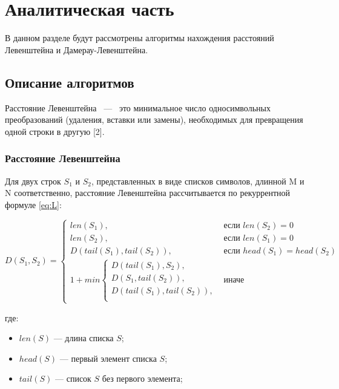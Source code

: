 \chapter{Аналитическая часть}

В данном разделе будут рассмотрены алгоритмы нахождения расстояний Левенштейна и Дамерау-Левенштейна.

\section{Описание алгоритмов}

Расстояние Левенштейна ~---~ это минимальное число односимвольных преобразований (удаления, вставки или замены), необходимых для превращения одной строки в другую [2].

\subsection{Расстояние Левенштейна}
Для двух строк $S_{1}$ и $S_{2}$, представленных в виде списков символов, длинной M и N соответственно, расстояние Левенштейна рассчитывается по рекуррентной формуле \ref{eq:L}:

\begin{equation}
	\label{eq:L}
	D(S_{1}, S_{2}) = \begin{cases}
	len(S_{1}), &\text{если $len(S_{2})=0$}\\
	len(S_{2}), &\text{если $len(S_{1})=0$}\\
	D(tail(S_{1}), tail(S_{2})), &\text{если $head(S_{1})=head(S_{2})$}\\
	1 + min \begin{cases}
		D(tail(S_{1}), S_{2}),\\
		D(S_{1}, tail(S_{2})),\\
		D(tail(S_{1}), tail(S_{2})),\\
	\end{cases}
	&\text{иначе}
	\end{cases}
\end{equation}

\vspace{5mm}

где:
\begin{itemize}
	\item $len(S)$ — длина списка $S$;
	\item $head(S)$ — первый элемент списка $S$;
	\item $tail(S)$ — список $S$ без первого элемента;
\end{itemize}


